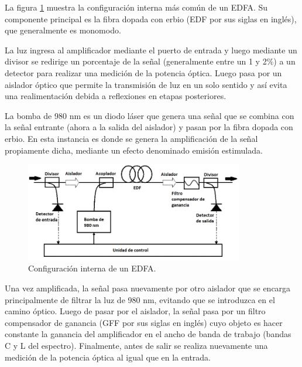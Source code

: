 La figura \ref{fig:EDFAinterno} muestra la configuración interna más común de un EDFA. Su componente principal es la fibra dopada con erbio (EDF por sus siglas en inglés), que generalmente es monomodo\protect\footnotemark . 


La luz ingresa al amplificador mediante el puerto de entrada y luego mediante un divisor se redirige un porcentaje de la señal (generalmente entre un 1 y 2\%) a un detector para realizar una medición de la potencia óptica. Luego pasa por un aislador óptico que permite la transmisión de luz en un solo sentido y así evita una realimentación debida a reflexiones en etapas posteriores.

La bomba de 980 nm es un diodo láser que genera una señal que se combina con la señal entrante (ahora a la salida del aislador) y pasan por la fibra dopada con erbio. En esta instancia es donde se genera la amplificación de la señal propiamente dicha, mediante un efecto denominado emisión estimulada\protect\footnotemark .


\begin{figure}[H]
\centering
\includegraphics[width=0.85\textwidth]{./Figures/EDFAinterno.png}
\caption{Configuración interna de un EDFA.}
\label{fig:EDFAinterno}
\end{figure}

Una vez amplificada, la señal pasa nuevamente por otro aislador que se encarga principalmente de filtrar la luz de 980 nm, evitando que se introduzca en el camino óptico. Luego de pasar por el aislador, la señal pasa por un filtro compensador de ganancia (GFF por sus siglas en inglés) cuyo objeto es hacer constante la ganancia del amplificador en el ancho de banda de trabajo (bandas C y L del espectro). Finalmente, antes de salir se realiza nuevamente una medición de la potencia óptica al igual que en la entrada.

